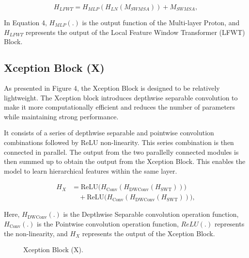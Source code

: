 \documentclass[twocolumn]{svjour3}          %
\begin{document}
\begin{equation}
{H_{LFWT}}= {H_{MLP}}({H_{LN}}({M_{SWMSA}})) + {M_{SWMSA}},
\end{equation}

In Equation 4, ${H_{MLP}}$$(.)$ is the output function of the Multi-layer Proton, and ${H_{LFWT}}$ represents the output of the Local Feature Window Transformer (LFWT) Block.

\subsection{Xception Block (X)}

As presented in Figure 4, the Xception Block is designed to be relatively lightweight. The Xception block introduces depthwise separable convolution to make it more computationally efficient and reduces the number of parameters while maintaining strong performance.

It consists of a series of depthwise separable and pointwise convolution combinations followed by ReLU non-linearity. This series combination is then connected in parallel. The output from the two parallelly connected modules is then summed up to obtain the output from the Xception Block. This enables the model to learn hierarchical features within the same layer.

\begin{equation}
\begin{aligned}
    {H_{X}} &= \text{ReLU}\bigl(H_{\text{Conv}}(H_{\text{DWConv}}(H_{\text{SWT}}))\bigr) \\
    &\quad+ \text{ReLU}\bigl(H_{\text{Conv}}(H_{\text{DWConv}}(H_{\text{SWT}}))\bigr),
\end{aligned}
\end{equation}

Here, $H_{\text{DWConv}}$$(.)$ is the Depthwise Separable convolution operation function, ${H_{\text{Conv}}}$$(.)$  is the Pointwise convolution operation function, ${ReLU}$$(.)$ represents the non-linearity, and ${H_{X}}$ represents the output of the Xception Block.

\begin{figure}
  \centering
   \caption {Xception Block (X).}
    \label{fig:4}
\end{figure}
\end{document}
